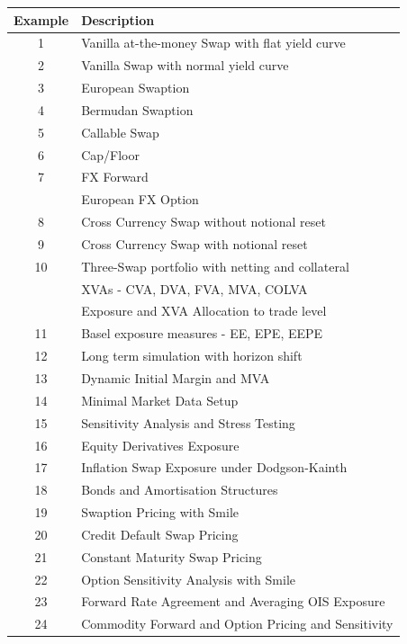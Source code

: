 \documentclass[12pt, a4paper]{article}
\begin{document}
\begin{table}[hbt]
\scriptsize
\begin{center}
\begin{tabular}{|c|l|}
\hline
Example & Description \\
\hline
\hline
1 & Vanilla at-the-money Swap with flat yield curve \\
\hline
2 & Vanilla Swap with normal yield curve \\
\hline
3 & European Swaption \\
\hline
4 & Bermudan Swaption \\
\hline
5 & Callable Swap \\
\hline
6 & Cap/Floor \\
\hline
7 & FX Forward \\
  & European FX Option \\ 
\hline
8 & Cross Currency Swap without notional reset \\
\hline
9 & Cross Currency Swap with notional reset \\
\hline
10 & Three-Swap portfolio with netting and collateral \\
   & XVAs - CVA, DVA, FVA, MVA, COLVA \\
   & Exposure and XVA Allocation to trade level \\
\hline
11 & Basel exposure measures - EE, EPE, EEPE \\
\hline
12 & Long term simulation with horizon shift \\
\hline
13 & Dynamic Initial Margin and MVA \\
\hline
14 & Minimal Market Data Setup \\
\hline
15 & Sensitivity Analysis and Stress Testing \\
\hline
16 & Equity Derivatives Exposure \\
\hline
17 & Inflation Swap Exposure under Dodgson-Kainth\\
\hline
18 & Bonds and Amortisation Structures\\
\hline
19 & Swaption Pricing with Smile\\
\hline
20 & Credit Default Swap Pricing\\
\hline
21 & Constant Maturity Swap Pricing\\
\hline
22 & Option Sensitivity Analysis with Smile\\
\hline
23 & Forward Rate Agreement and Averaging OIS Exposure\\
\hline
24 & Commodity Forward and Option Pricing and Sensitivity\\

\end{tabular}
\end{center}
\end{table}
\end{document}
